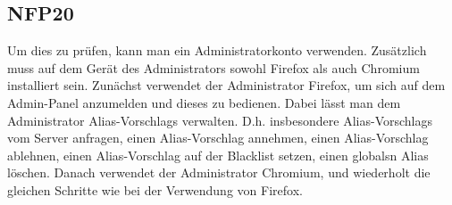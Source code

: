 \subsection*{NFP20}
Um dies zu prüfen, kann man ein \Gls{Administrator}konto verwenden. Zusätzlich muss auf dem Gerät des \Gls{Administrator}s sowohl \Gls{Firefox} als auch \Gls{Chromium} installiert sein. Zunächst verwendet der \Gls{Administrator} \Gls{Firefox}, um sich auf dem \Gls{Admin-Panel} anzumelden und dieses zu bedienen. Dabei lässt man dem \Gls{Administrator} \Glspl{Alias-Vorschlag} verwalten. D.h. insbesondere \Glspl{Alias-Vorschlag} vom \Gls{Server} anfragen, einen \Gls{Alias-Vorschlag} annehmen, einen \Gls{Alias-Vorschlag} ablehnen, einen \Gls{Alias-Vorschlag} auf der \Gls{Blacklist} setzen, einen \glspl{global}n \Gls{Alias} löschen. Danach verwendet der \Gls{Administrator} \Gls{Chromium}, und wiederholt die gleichen Schritte wie bei der Verwendung von \Gls{Firefox}.